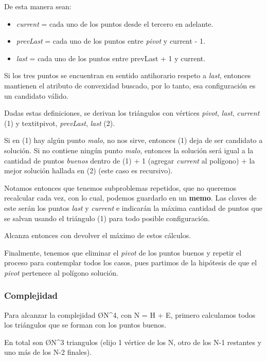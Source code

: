 De esta manera sean:
\begin{itemize}
  \item \textit{current} = cada uno de los puntos desde el tercero en adelante.

  \item \textit{prevLast} = cada uno de los puntos entre \textit{pivot} y current - 1.

  \item \textit{last} = cada uno de los puntos entre prevLast + 1 y current.
\end{itemize}

Si los tres puntos se encuentran en sentido antihorario respeto a \textit{last}, entonces mantienen el atributo de convexidad buscado, por lo tanto, esa configuración es un candidato válido.

Dadas estas definiciones, se derivan los triángulos con vértices \textit{pivot}, \textit{last}, \textit{current} (1) y textit{pivot}, \textit{prevLast}, \textit{last} (2).

Si en (1) hay algún punto \textit{malo}, no nos sirve, entonces (1) deja de ser candidato a solución. Si no contiene ningún punto \textit{malo}, entonces la solución será igual a la cantidad de puntos \textit{buenos} dentro de (1) + 1 (agregar \textit{current} al polígono) + la mejor solución hallada en (2) (este caso es recursivo).

Notamos entonces que tenemos subproblemas repetidos, que no queremos recalcular cada vez, con lo cual, podemos guardarlo en un \textbf{memo}. Las claves de este serán los puntos \textit{last} y \textit{current} e indicarán la máxima cantidad de puntos que se salvan usando el triángulo (1) para todo posible configuración.

Alcanza entonces con devolver el máximo de estos cálculos.

Finalmente, tenemos que eliminar el \textit{pivot} de los puntos buenos y repetir el proceso para contemplar todos los casos, pues partimos de la hipótesis de que el \textit{pivot} pertenece al polígono solución.

\subsubsection{Complejidad}
Para alcanzar la complejidad \O{N^4}, con N = H + E, primero calculamos todos los triángulos que se forman con los puntos buenos.

En total son \O{N^3} triangulos (elijo 1 vértice de los N, otro de los N-1 restantes y uno más de los N-2 finales).

